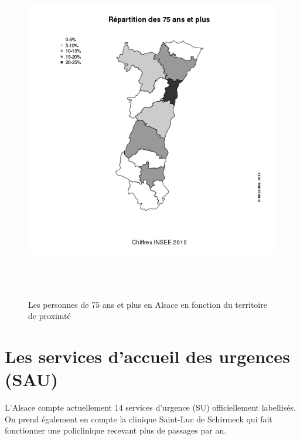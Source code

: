 \documentclass[12pt,english,french,twoside]{report}\usepackage[]{graphicx}\usepackage[]{color}
\begin{document}
\begin{figure}[ht]
 \centering
 \includegraphics[height=15cm,keepaspectratio=true]{../figure/75ans.png}
 \caption{Les personnes de 75 ans et plus en Alsace en fonction du territoire de proximté}
 \label{fig:75ans}
\end{figure}

\section{Les services d'accueil des urgences (SAU)}

L'Alsace compte actuellement 14 services d'urgence (SU) officiellement labellisés. On prend également en compte la clinique Saint-Luc de Schirmeck qui fait fonctionner une policlinique recevant plus de  passages par an.
\end{document}
